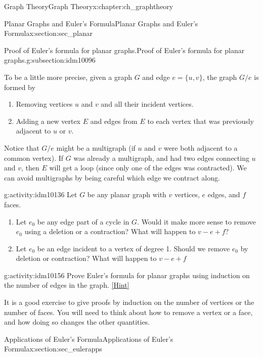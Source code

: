 \documentclass[oneside,10pt,]{book}
\numberwithin{equation}{chapter}
\begin{document}
\begin{chapterptx}{Graph Theory}{}{Graph Theory}{}{}{x:chapter:ch_graphtheory}
\begin{sectionptx}{Planar Graphs and Euler's Formula}{}{Planar Graphs and Euler's Formula}{}{}{x:section:sec_planar}
\begin{subsectionptx}{Proof of Euler's formula for planar graphs.}{}{Proof of Euler's formula for planar graphs.}{}{}{g:subsection:idm10096}
\par
To be a little more precise, given a graph \(G\) and edge \(e = \{u,v\}\), the graph \(G/e\) is formed by%
\begin{enumerate}
\item{}Removing vertices \(u\) and \(v\) and all their incident vertices.%
\item{}Adding a new vertex \(E\) and edges from \(E\) to each vertex that was previously adjacent to \(u\) or \(v\).%
\end{enumerate}
Notice that \(G/e\) might be a multigraph (if \(u\) and \(v\) were both adjacent to a common vertex).  If \(G\) was already a multigraph, and had two edges connecting \(u\) and \(v\), then \(E\) will get a loop (since only one of the edges was contracted).  We can avoid multigraphs by being careful which edge we contract along.%
\begin{activity}{}{g:activity:idm10136}%
Let \(G\) be any planar graph with \(v\) vertices, \(e\) edges, and \(f\) faces.%
\begin{enumerate}[font=\bfseries,label=(\alph*),ref=\alph*]
\item{}Let \(e_0\) be any edge part of a cycle in \(G\).  Would it make more sense to remove \(e_0\) using a deletion or a contraction?  What will happen to \(v - e + f\)?%
\item{}Let \(e_0\) be an edge incident to a vertex of degree 1.  Should we remove \(e_0\) by deletion or contraction?  What will happen to \(v- e + f\)%
\end{enumerate}
\end{activity}
\begin{activity}{}{g:activity:idm10156}%
Prove Euler's formula for planar graphs using induction on the number of edges in the graph.%
\space\hspace*{0pt}\hfill{\tiny\hyperlink{g:hint:idm10159-back}{[Hint]}}\end{activity}
It is a good exercise to give proofs by induction on the number of vertices or the number of faces.  You will need to think about how to remove a vertex or a face, and how doing so changes the other quantities.%
\end{subsectionptx}
\end{sectionptx}
%
%
\typeout{************************************************}
\typeout{************************************************}
%
\begin{sectionptx}{Applications of Euler's Formula}{}{Applications of Euler's Formula}{}{}{x:section:sec_eulerapps}

\end{sectionptx}
\end{chapterptx}
\end{document}
